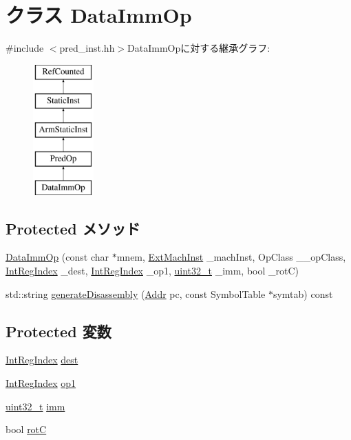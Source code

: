 \hypertarget{classArmISA_1_1DataImmOp}{
\section{クラス DataImmOp}
\label{classArmISA_1_1DataImmOp}
}


{\ttfamily \#include $<$pred\_\-inst.hh$>$}DataImmOpに対する継承グラフ:\begin{figure}[H]
\begin{center}
\leavevmode
\includegraphics[height=5cm]{classArmISA_1_1DataImmOp}
\end{center}
\end{figure}
\subsection*{Protected メソッド}
\begin{DoxyCompactItemize}
\item 
\hyperlink{classArmISA_1_1DataImmOp_a6760ad5c224cb8b80ad74639605925cf}{DataImmOp} (const char $\ast$mnem, \hyperlink{classStaticInst_a5605d4fc727eae9e595325c90c0ec108}{ExtMachInst} \_\-machInst, OpClass \_\-\_\-opClass, \hyperlink{namespaceArmISA_ae64680ba9fb526106829d6bf92fc791b}{IntRegIndex} \_\-dest, \hyperlink{namespaceArmISA_ae64680ba9fb526106829d6bf92fc791b}{IntRegIndex} \_\-op1, \hyperlink{Type_8hh_a435d1572bf3f880d55459d9805097f62}{uint32\_\-t} \_\-imm, bool \_\-rotC)
\item 
std::string \hyperlink{classArmISA_1_1DataImmOp_a95d323a22a5f07e14d6b4c9385a91896}{generateDisassembly} (\hyperlink{classm5_1_1params_1_1Addr}{Addr} pc, const SymbolTable $\ast$symtab) const 
\end{DoxyCompactItemize}
\subsection*{Protected 変数}
\begin{DoxyCompactItemize}
\item 
\hyperlink{namespaceArmISA_ae64680ba9fb526106829d6bf92fc791b}{IntRegIndex} \hyperlink{classArmISA_1_1DataImmOp_aec72e8e45bdc87abeeeb75d2a8a9a716}{dest}
\item 
\hyperlink{namespaceArmISA_ae64680ba9fb526106829d6bf92fc791b}{IntRegIndex} \hyperlink{classArmISA_1_1DataImmOp_a4c465c43ad568f8bcf8ae71480e9cfea}{op1}
\item 
\hyperlink{Type_8hh_a435d1572bf3f880d55459d9805097f62}{uint32\_\-t} \hyperlink{classArmISA_1_1DataImmOp_a3aa9e175bd81b38df0e566643d5d4f8d}{imm}
\item 
bool \hyperlink{classArmISA_1_1DataImmOp_a9257952bcba8bd8ebf038e74f9a07e22}{rotC}
\end{DoxyCompactItemize}


